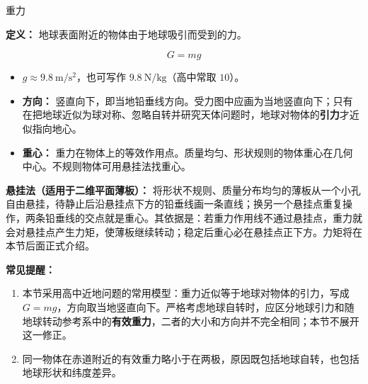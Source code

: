 \begin{conceptbox}{重力}

\textbf{定义：} 地球表面附近的物体由于地球吸引而受到的力。

\[
G = mg
\]

\begin{itemize}
  \item $g \approx 9.8\ \mathrm{m/s^2}$，也可写作 $9.8\ \mathrm{N/kg}$（高中常取 $10$）。
  \item \textbf{方向：} 竖直向下，即当地铅垂线方向。受力图中应画为当地竖直向下；只有在把地球近似为球对称、忽略自转并研究天体问题时，地球对物体的\textbf{引力}才近似指向地心。
  \item \textbf{重心：} 重力在物体上的等效作用点。质量均匀、形状规则的物体重心在几何中心。不规则物体可用悬挂法找重心。
\end{itemize}

\textbf{悬挂法（适用于二维平面薄板）：} 将形状不规则、质量分布均匀的薄板从一个小孔自由悬挂，待静止后沿悬挂点下方的铅垂线画一条直线；换另一个悬挂点重复操作，两条铅垂线的交点就是重心。其依据是：若重力作用线不通过悬挂点，重力就会对悬挂点产生力矩，使薄板继续转动；稳定后重心必在悬挂点正下方。力矩将在本节后面正式介绍。

\begin{center}


\label{fig:center-of-gravity-suspension}
\end{center}

\textbf{常见提醒：}
\begin{enumerate}
  \item 本节采用高中近地问题的常用模型：重力近似等于地球对物体的引力，写成 $G=mg$，方向取当地竖直向下。严格考虑地球自转时，应区分地球引力和随地球转动参考系中的\textbf{有效重力}，二者的大小和方向并不完全相同；本节不展开这一修正。
  \item 同一物体在赤道附近的有效重力略小于在两极，原因既包括地球自转，也包括地球形状和纬度差异。
\end{enumerate}

\end{conceptbox}

